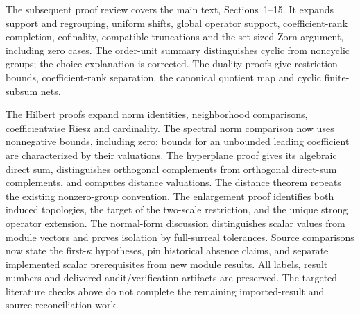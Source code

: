 \documentclass[11pt,letterpaper]{article}
\numberwithin{equation}{section}
\theoremstyle{definition}
\theoremstyle{remark}
\begin{document}
The subsequent proof review covers the main text, Sections~1--15.
It expands support and regrouping, uniform shifts, global operator support,
coefficient-rank completion, cofinality, compatible truncations and the
set-sized Zorn argument, including zero cases. The order-unit summary
distinguishes cyclic from noncyclic groups; the choice explanation is
corrected. The duality proofs give restriction bounds, coefficient-rank
separation, the canonical quotient map and cyclic finite-subsum nets.

The Hilbert proofs expand norm identities, neighborhood comparisons,
coefficientwise Riesz and cardinality. The spectral norm comparison now
uses nonnegative bounds, including zero; bounds for an unbounded leading
coefficient are characterized by their valuations. The hyperplane proof
gives its algebraic direct sum, distinguishes orthogonal complements
from orthogonal direct-sum complements, and computes distance valuations.
The distance theorem repeats the existing nonzero-group convention.
The enlargement proof identifies both induced topologies, the target
of the two-scale restriction, and the unique strong operator extension.
The normal-form discussion distinguishes scalar values from module
vectors and proves isolation by full-surreal tolerances. Source
comparisons now state the first-$\kappa$ hypotheses, pin historical
absence claims, and separate implemented scalar prerequisites from new
module results. All labels, result numbers and delivered audit/verification
artifacts are preserved. The targeted literature checks above do not
complete the remaining imported-result and source-reconciliation work.
\end{document}
